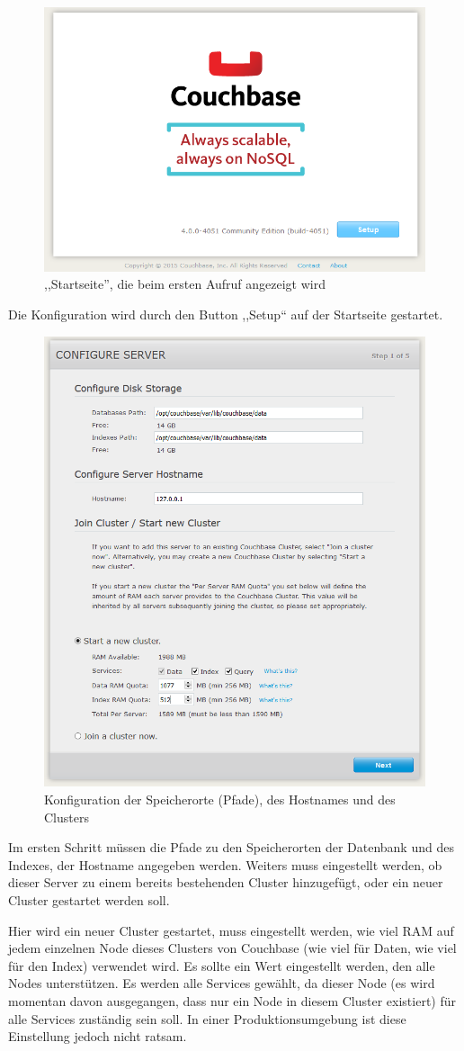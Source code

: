 \begin{figure}[!h]
	\begin{center}
		\includegraphics[width=0.5\linewidth]{images/hello-msg.png}
		\caption{,,Startseite'', die beim ersten Aufruf angezeigt wird}
	\end{center}
\end{figure}
\pagebreak
Die Konfiguration wird durch den Button ,,Setup`` auf der Startseite gestartet.

\begin{figure}[!h]
	\begin{center}
		\includegraphics[width=0.6\linewidth]{images/init-config-1.png}
		\caption{Konfiguration der Speicherorte (Pfade), des Hostnames und des Clusters}
	\end{center}
\end{figure}

Im ersten Schritt müssen die Pfade zu den Speicherorten der Datenbank und des Indexes, der Hostname angegeben werden. Weiters muss eingestellt werden, ob dieser Server zu einem bereits bestehenden Cluster hinzugefügt, oder ein neuer Cluster gestartet werden soll.

Hier wird ein neuer Cluster gestartet, muss eingestellt werden, wie viel RAM auf jedem einzelnen Node dieses Clusters von Couchbase (wie viel für Daten, wie viel für den Index) verwendet wird. Es sollte ein Wert eingestellt werden, den alle Nodes unterstützen. Es werden alle Services gewählt, da dieser Node (es wird momentan davon ausgegangen, dass nur ein Node in diesem Cluster existiert) für alle Services zuständig sein soll. In einer Produktionsumgebung ist diese Einstellung jedoch nicht ratsam.

